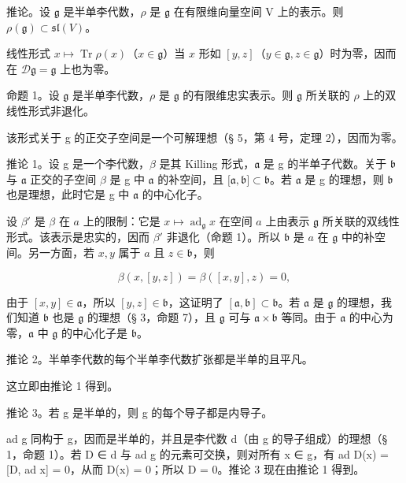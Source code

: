 推论。设 \(\mathfrak{g}\) 是半单李代数，\(\rho\) 是 \(\mathfrak{g}\) 在有限维向量空间 V 上的表示。则 \(\rho(\mathfrak{g}) \subset \mathfrak{sl}(V)\)。

线性形式 \(x \mapsto \operatorname{Tr} \rho(x)\)（\(x \in \mathfrak{g}\)）当 \(x\) 形如 \([y, z]\)（\(y \in \mathfrak{g}, z \in \mathfrak{g}\)）时为零，因而在 \(\mathcal{D}\mathfrak{g} = \mathfrak{g}\) 上也为零。

命题 1。设 \(\mathfrak{g}\) 是半单李代数，\(\rho\) 是 \(\mathfrak{g}\) 的有限维忠实表示。则 \(\mathfrak{g}\) 所关联的 \(\rho\) 上的双线性形式非退化。

该形式关于 g 的正交子空间是一个可解理想（§ 5，第 4 号，定理 2），因而为零。

推论 1。设 g 是一个李代数，\(\beta\) 是其 Killing 形式，\(\mathfrak{a}\) 是 g 的半单子代数。关于 \(\mathfrak{b}\) 与 \(\mathfrak{a}\) 正交的子空间 \(\beta\) 是 g 中 \(\mathfrak{a}\) 的补空间，且 \({[}\mathfrak{a}, \mathfrak{b}{]} \subset \mathfrak{b}\)。若 \(\mathfrak{a}\) 是 g 的理想，则 \(\mathfrak{b}\) 也是理想，此时它是 g 中 \(\mathfrak{a}\) 的中心化子。

设 \(\beta'\) 是 \(\beta\) 在 \(a\) 上的限制：它是 \(x \mapsto \operatorname{ad}_{\mathfrak{g}} x\) 在空间 \(a\) 上由表示 \(\mathfrak{g}\) 所关联的双线性形式。该表示是忠实的，因而 \(\beta'\) 非退化（命题 1）。所以 \(\mathfrak{b}\) 是 \(a\) 在 \(\mathfrak{g}\) 中的补空间。另一方面，若 \(x, y\) 属于 \(a\) 且 \(z \in \mathfrak{b}\)，则

\[
\beta (x, [ y, z ]) = \beta ([ x, y ], z) = 0,
\]

由于 \([x,y] \in \mathfrak{a}\)，所以 \([y,z] \in \mathfrak{b}\)，这证明了 \([\mathfrak{a},\mathfrak{b}] \subset \mathfrak{b}\)。若 \(\mathfrak{a}\) 是 \(\mathfrak{g}\) 的理想，我们知道 \(\mathfrak{b}\) 也是 \(\mathfrak{g}\) 的理想（§ 3，命题 7），且 \(\mathfrak{g}\) 可与 \(\mathfrak{a} \times \mathfrak{b}\) 等同。由于 \(\mathfrak{a}\) 的中心为零，\(\mathfrak{a}\) 中 \(\mathfrak{g}\) 的中心化子是 \(\mathfrak{b}\)。

推论 2。半单李代数的每个半单李代数扩张都是半单的且平凡。

这立即由推论 1 得到。

推论 3。若 g 是半单的，则 g 的每个导子都是内导子。

ad g 同构于 g，因而是半单的，并且是李代数 d（由 g 的导子组成）的理想（§ 1，命题 1）。若 D ∈ d 与 ad g 的元素可交换，则对所有 x ∈ g，有 ad D(x) = {[}D, ad x{]} = 0，从而 D(x) = 0；所以 D = 0。推论 3 现在由推论 1 得到。
